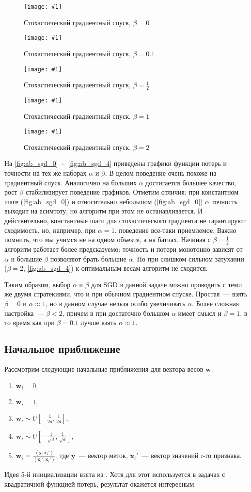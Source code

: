 \documentclass[12pt]{article}
\renewcommand{\vec}[1]{\mathbf{#1}}
\newcommand{\mpl}[2]{
    \begin{figure}[!h]
        \texttt{[image: \#1]}
        \centering
        \caption{#2}
        \label{fig:#1}
     \end{figure}
}
\begin{document}
\mpl{ab_sgd_0}{Стохастический градиентный спуск, $\beta=0$}
\mpl{ab_sgd_1}{Стохастический градиентный спуск, $\beta=0.1$}
\mpl{ab_sgd_2}{Стохастический градиентный спуск, $\beta=\frac{1}{2}$}
\mpl{ab_sgd_3}{Стохастический градиентный спуск, $\beta=1$}
\mpl{ab_sgd_4}{Стохастический градиентный спуск, $\beta=2$}

На \autoref{fig:ab_sgd_0}~--~\autoref{fig:ab_sgd_4} приведены графики функции потерь и точности на тех же наборах $\alpha$ и $\beta$. В целом поведение очень похоже на градиентный спуск. Аналогично на больших $\alpha$ достигается большее качество, рост $\beta$ стабилизирует поведение графиков. Отметим отличия: при константном шаге (\autoref{fig:ab_sgd_0}) и относительно небольшом (\autoref{fig:ab_sgd_0}) $\alpha$ точность выходит на асимтоту, но алгоритм при этом не останавливается. И действительно, константные шаги для стохастического градиента не гарантируют сходимость, но, например, при $\alpha=1$, поведение все-таки приемлемое. Важно помнить, что мы учимся не на одном объекте, а на батчах. Начиная с $\beta=\frac{1}{2}$ алгоритм работает более предсказуемо: точность и потери монотонно зависят от $\alpha$ и большие $\beta$ позволяют брать большие $\alpha$. Но при слишком сильном затухании ($\beta=2$, \autoref{fig:ab_sgd_4}) к оптимальным весам алгоритм не сходится.

Таким образом, выбор $\alpha$ и $\beta$ для SGD в данной задаче можно проводить с теми же двумя стратекиями, что и при обычном градиентном спуске. Простая~--- взять $\beta=0$ и $\alpha\approx 1$, но в данном случае нельзя особо увеличивать $\alpha$. Более сложная настройка~--- $\beta<2$, причем в при достаточно большом $\alpha$ имеет смысл и $\beta=1$, в то время как при $\beta=0.1$ лучше взять $\alpha\approx 1$.

\subsection{Начальное приближение}
Рассмотрим следующие начальные приближения для вектора весов $\vec{w}$:
\begin{enumerate}
    \item $\vec{w}_i=0$,
    \item $\vec{w}_i=1$,
    \item $\vec{w}_i\sim U[-\frac{1}{2d},\frac{1}{2d}]$,
    \item $\vec{w}_i\sim U[-\frac{1}{\sqrt{d}},\frac{1}{\sqrt{d}}]$,
    \item $\vec{w}_i=\frac{\left<\vec{y}, \vec{x}_i'\right>}{\left<\vec{x}_i',\vec{x}_i'\right>}$, где $\vec{y}$~--- вектор меток, $\vec{x}_i'$~--- вектор значений $i$-го признака.
\end{enumerate}
Идея 5-й инициализации взята из \cite{voron}. Хотя для этот используется в задачах с квадратичной функцией потерь, результат окажется интересным. 
\end{document}
